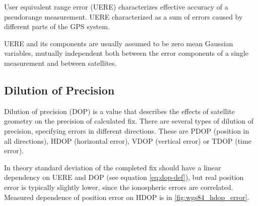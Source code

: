 
User equivalent range error (UERE) characterizes effective accuracy of a pseudorange measurement.
UERE characterized as a sum of errors caused by different parts of the GPS system.

UERE and its components are usually assumed to be zero mean Gaussian variables,
mutually independent both between the error components of a single measurement and between satellites.

\subsection{Dilution of Precision}
\label{sec:gps-dop}

Dilution of precision (DOP) is a value that describes the effects of satellite geometry
on the precision of calculated fix.
There are several types of dilution of precision, specifying errors in different directions.
These are PDOP (position in all directions), HDOP (horizontal error), VDOP (vertical error)
or TDOP (time error).

In theory standard deviation of the completed fix should have a linear dependency on
UERE and DOP (see equation \eqref{eq:dop-def}), but real position error is typically slightly lower,
since the ionospheric errors are correlated.
Measured dependence of position error on HDOP is in \cref{fig:wgs84_hdop_error}.


